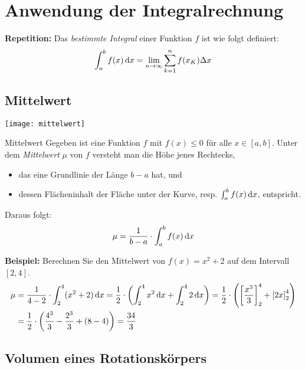 \section{Anwendung der Integralrechnung}\label{sec:anwendung-der-integralrechnung}

\textbf{Repetition:} Das \emph{bestimmte Integral} einer Funktion $f$ ist wie folgt definiert: \[\int_{a}^{b} f(x) \,\mathrm{d}x = \lim_{n \rightarrow \infty} \sum_{k=1}^{n} f(x_K) \Delta x\]

\subsection{Mittelwert}\label{subsec:mittelwert}

\begin{center}
    \texttt{[image: mittelwert]}
\end{center}

\begin{definition}{Mittelwert}
    Gegeben ist eine Funktion $f$ mit $f(x) \leq 0$ für alle $x \in [a,b]$.
    Unter dem \emph{Mittelwert} $\mu$ von $f$ versteht man die Höhe jenes Rechtecks,
    \begin{itemize}
        \item das eine Grundlinie der Länge $b - a$ hat, und
        \item dessen Flächeninhalt der Fläche unter der Kurve, resp. $\int_{a}^{b} f(x) \,\mathrm{d}x$, entspricht.
    \end{itemize}
    Daraus folgt: \[\mu = \frac{1}{b - a} \cdot \int_{a}^{b} f(x) \,\mathrm{d}x\]
\end{definition}

\textbf{Beispiel:} Berechnen Sie den Mittelwert von $f(x) = x^2 + 2$ auf dem Intervall $[2,4]$.
\begin{align*}
    \mu &= \frac{1}{4 - 2} \cdot \int_{2}^{4} (x^2 + 2) \,\mathrm{d}x = \frac{1}{2} \cdot \left( \int_{2}^{4} x^2 \,\mathrm{d}x + \int_{2}^{4} 2 \,\mathrm{d}x \right) = \frac{1}{2} \cdot \left( \left[ \frac{x^3}{3} \right]_{2}^{4} + \left[ 2x \right]_{2}^4 \right) \\
    &= \frac{1}{2} \cdot \left( \frac{4^3}{3} - \frac{2^3}{3} + (8 - 4) \right) = \frac{34}{3}
\end{align*}

\subsection{Volumen eines Rotationskörpers}\label{subsec:volumen-eines-rotationskorpers}

